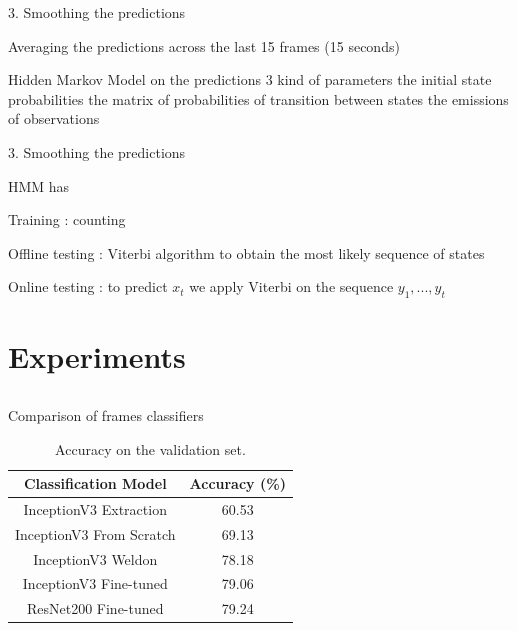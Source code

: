\begin{frame}{3. Smoothing the predictions}

	Averaging the predictions across the last 15 frames (15 seconds)
	
	Hidden Markov Model on the predictions
	3 kind of parameters
	the initial state probabilities
	the matrix of probabilities of transition between states 
	the emissions of observations

\end{frame}

\begin{frame}{3. Smoothing the predictions}

	HMM has 
	
	Training : counting
	
	Offline testing : Viterbi algorithm to obtain the most likely sequence of states
	
	Online testing : to predict $x_t$ we apply Viterbi on the sequence $y_1,...,y_t$

\end{frame}
	
\section{Experiments} \subsection{}\label{}

\begin{frame}{Comparison of frames classifiers}
	
	\begin{table}
	\begin{center}
		\begin{tabular}{|c|c|}
			\hline
			Classification Model & Accuracy (\%) \\
			\hline\hline
			InceptionV3 Extraction & 60.53 \\
			InceptionV3 From Scratch & 69.13 \\
			InceptionV3 Weldon & 78.18 \\
			InceptionV3 Fine-tuned & 79.06 \\
			ResNet200 Fine-tuned & 79.24 \\
			\hline
		\end{tabular}
	\end{center}
	\caption{Accuracy on the validation set.}
	\end{table}

\end{frame}

